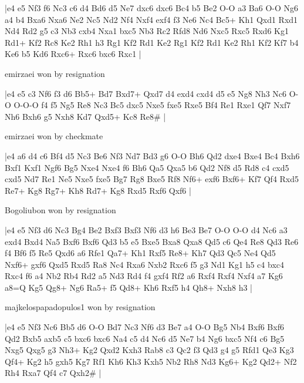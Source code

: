 \makegametitle
|e4 e5 Nf3 f6 Nc3 c6 d4 Bd6 d5 Ne7 dxc6 dxc6 Bc4 b5 Be2 O-O a3 Ba6 O-O Ng6 a4 b4 Bxa6 Nxa6 Ne2 Nc5 Nd2 Nf4 Nxf4 exf4 f3 Ne6 Nc4 Bc5+ Kh1 Qxd1 Rxd1 Nd4 Rd2 g5 c3 Nb3 cxb4 Nxa1 bxc5 Nb3 Rc2 Rfd8 Nd6 Nxc5 Rxc5 Rxd6 Kg1 Rd1+ Kf2 Rc8 Ke2 Rh1 h3 Rg1 Kf2 Rd1 Ke2 Rg1 Kf2 Rd1 Ke2 Rh1 Kf2 Kf7 b4 Ke6 b5 Kd6 Rxc6+ Rxc6 bxc6 Rxc1  |

\showboard

emirzaei won by resignation

\makegametitle
|e4 e5 c3 Nf6 f3 d6 Bb5+ Bd7 Bxd7+ Qxd7 d4 exd4 cxd4 d5 e5 Ng8 Nh3 Nc6 O-O O-O-O f4 f5 Ng5 Re8 Nc3 Bc5 dxc5 Nxe5 fxe5 Rxe5 Bf4 Re1 Rxe1 Qf7 Nxf7 Nh6 Bxh6 g5 Nxh8 Kd7 Qxd5+ Kc8 Re8\#  |

\showboard

emirzaei won by checkmate

\makegametitle
|e4 a6 d4 c6 Bf4 d5 Nc3 Be6 Nf3 Nd7 Bd3 g6 O-O Bh6 Qd2 dxe4 Bxe4 Bc4 Bxh6 Bxf1 Kxf1 Ngf6 Bg5 Nxe4 Nxe4 f6 Bh6 Qa5 Qxa5 b6 Qd2 Nf8 d5 Rd8 c4 cxd5 cxd5 Nd7 Re1 Ne5 Nxe5 fxe5 Bg7 Rg8 Bxe5 Rf8 Nf6+ exf6 Bxf6+ Kf7 Qf4 Rxd5 Re7+ Kg8 Rg7+ Kh8 Rd7+ Kg8 Rxd5 Rxf6 Qxf6  |

\showboard

Bogoliubon won by resignation

\makegametitle
|e4 e5 Nf3 d6 Nc3 Bg4 Be2 Bxf3 Bxf3 Nf6 d3 h6 Be3 Be7 O-O O-O d4 Nc6 a3 exd4 Bxd4 Na5 Bxf6 Bxf6 Qd3 b5 e5 Bxe5 Bxa8 Qxa8 Qd5 c6 Qe4 Re8 Qd3 Re6 f4 Bf6 f5 Re5 Qxd6 a6 Rfe1 Qa7+ Kh1 Rxf5 Re8+ Kh7 Qd3 Qc5 Ne4 Qd5 Nxf6+ gxf6 Qxd5 Rxd5 Ra8 Nc4 Rxa6 Nxb2 Rxc6 f5 g3 Nd1 Kg1 h5 c4 bxc4 Rxc4 f6 a4 Nb2 Rb4 Rd2 a5 Nd3 Rd4 f4 gxf4 Rf2 a6 Rxf4 Rxf4 Nxf4 a7 Kg6 a8=Q Kg5 Qg8+ Ng6 Ra5+ f5 Qd8+ Kh6 Rxf5 h4 Qh8+ Nxh8 h3  |

\showboard

majkelospapadopulos1 won by resignation

\makegametitle
|e4 e5 Nf3 Nc6 Bb5 d6 O-O Bd7 Nc3 Nf6 d3 Be7 a4 O-O Bg5 Nb4 Bxf6 Bxf6 Qd2 Bxb5 axb5 c5 bxc6 bxc6 Na4 c5 d4 Nc6 d5 Ne7 b4 Ng6 bxc5 Nf4 c6 Bg5 Nxg5 Qxg5 g3 Nh3+ Kg2 Qxd2 Kxh3 Rab8 c3 Qc2 f3 Qd3 g4 g5 Rfd1 Qe3 Kg3 Qf4+ Kg2 h5 gxh5 Kg7 Rf1 Kh6 Kh3 Kxh5 Nb2 Rh8 Nd3 Kg6+ Kg2 Qd2+ Nf2 Rh4 Rxa7 Qf4 c7 Qxh2\#  |

